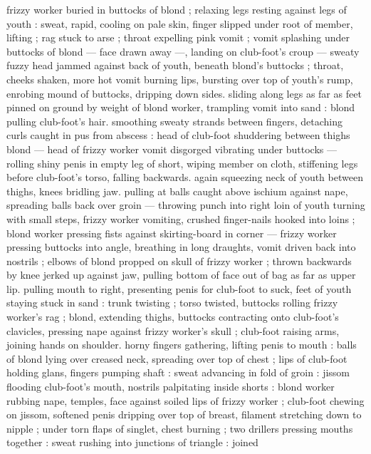 {frizzy worker buried in buttocks of blond ; relaxing legs resting 
against legs of youth : sweat, rapid, cooling on pale skin, finger 
slipped under root of member, lifting ; rag stuck to arse ; throat 
expelling pink vomit ; vomit splashing under buttocks of blond --- 
face drawn away ---, landing on club-foot's croup --- sweaty fuzzy 
head jammed against back of youth, beneath blond's buttocks ; 
throat, cheeks shaken, more hot vomit burning lips, bursting over top 
of youth's rump, enrobing mound of buttocks, dripping down sides. 
sliding along legs as far as feet pinned on ground by weight of blond 
worker, trampling vomit into sand : blond pulling club-foot's hair. 
smoothing sweaty strands between fingers, detaching curls caught in 
pus from abscess : head of club-foot shuddering between thighs 
blond --- head of frizzy worker vomit disgorged vibrating under 
buttocks --- rolling shiny penis in empty leg of short, wiping member 
on cloth, stiffening legs before club-foot's torso, falling backwards. 
again squeezing neck of youth between thighs, knees bridling jaw. 
pulling at balls caught above ischium against nape, spreading balls 
back over groin --- throwing punch into right loin of youth turning 
with small steps, frizzy worker vomiting, crushed finger-nails hooked 
into loins ; blond worker pressing fists against skirting-board in 
corner --- frizzy worker pressing buttocks into angle, breathing in 
long draughts, vomit driven back into nostrils ; elbows of blond 
propped on skull of frizzy worker ; thrown backwards by knee jerked 
up against jaw, pulling bottom of face out of bag as far as upper lip. 
pulling mouth to right, presenting penis for club-foot to suck, feet of 
youth staying stuck in sand : trunk twisting ; torso twisted, buttocks 
rolling frizzy worker's rag ; blond, extending thighs, buttocks 
contracting onto club-foot's clavicles, pressing nape against frizzy 
worker's skull ; club-foot raising arms, joining hands on shoulder. 
horny fingers gathering, lifting penis to mouth : balls of blond lying 
over creased neck, spreading over top of chest ; lips of club-foot 
holding glans, fingers pumping shaft : sweat advancing in fold of 
groin : jissom flooding club-foot's mouth, nostrils palpitating inside 
shorts : blond worker rubbing nape, temples, face against soiled lips 
of frizzy worker ; club-foot chewing on jissom, softened penis 
dripping over top of breast, filament stretching down to nipple ; 
under torn flaps of singlet, chest burning ; two drillers pressing 
mouths together : sweat rushing into junctions of triangle : joined 
}

